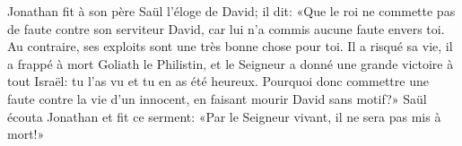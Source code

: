 Jonathan fit à son père Saül l’éloge de David;
	il dit: «Que le roi ne commette pas de faute contre son serviteur David,
	car lui n’a commis aucune faute envers toi.
Au contraire, ses exploits sont une très bonne chose pour toi.
Il a risqué sa vie, il a frappé à mort Goliath le Philistin,
	et le Seigneur a donné une grande victoire à tout Israël:
	tu l’as vu et tu en as été heureux.
Pourquoi donc commettre une faute contre la vie d’un innocent,
	en faisant mourir David sans motif?»
Saül écouta Jonathan et fit ce serment:
	«Par le Seigneur vivant, il ne sera pas mis à mort!»
